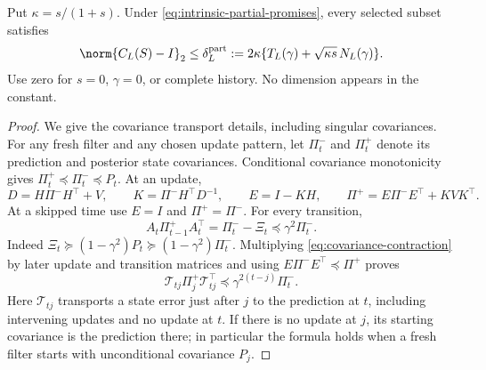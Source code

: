 \begin{theorem}
\label{thm:partial-locality}
Put $\kappa=s/(1+s)$. Under \eqref{eq:intrinsic-partial-promises},
every selected subset satisfies
\begin{equation}
 \norm{C_L(S)-I}_2\le
 \delta_L^{\mathrm{part}}:=
 2\kappa\{T_L(\gamma)+\sqrt{\kappa s}\,N_L(\gamma)\}.
 \label{eq:partial-normalized-delta}
\end{equation}
Use zero for $s=0$, $\gamma=0$, or complete history. No dimension
appears in the constant.
\end{theorem}
\begin{proof}
We give the covariance transport details, including singular covariances.
For any fresh filter and any chosen update pattern, let $\Pi_t^-$ and
$\Pi_t^+$ denote its prediction and posterior state covariances.
Conditional covariance monotonicity gives
$\Pi_t^+\preceq\Pi_t^-\preceq P_t$.
At an update,
\[
 D=H\Pi^-H^\top+V,\qquad K=\Pi^-H^\top D^{-1},\qquad E=I-KH,
 \qquad \Pi^+=E\Pi^-E^\top+KVK^\top.
\]
At a skipped time use $E=I$ and $\Pi^+=\Pi^-$. For every transition,
\begin{equation}
 A_t\Pi_{t-1}^+A_t^\top=\Pi_t^- -\Xi_t
 \preceq\gamma^2\Pi_t^-.
 \label{eq:covariance-contraction}
\end{equation}
Indeed $\Xi_t\succeq(1-\gamma^2)P_t
\succeq(1-\gamma^2)\Pi_t^-$. Multiplying
\eqref{eq:covariance-contraction} by later update and transition matrices
and using $E\Pi^-E^\top\preceq\Pi^+$ proves
\begin{equation}
 \mathcal T_{tj}\Pi_j^+\mathcal T_{tj}^\top
       \preceq\gamma^{2(t-j)}\Pi_t^-.
 \label{eq:transport}
\end{equation}
Here $\mathcal T_{tj}$ transports a state error just after $j$ to the
prediction at $t$, including intervening updates and no update at $t$.
If there is no update at $j$, its starting covariance is the prediction
there; in particular the formula holds when a fresh filter starts with
unconditional covariance $P_j$.


\end{proof}
